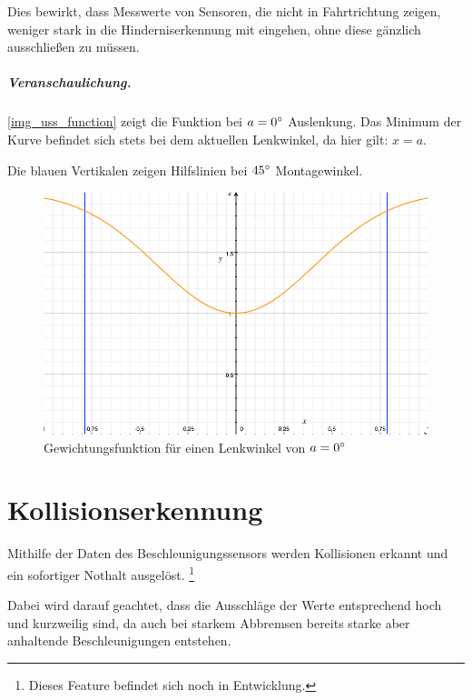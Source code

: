 \documentclass[a4paper,12pt]{report}
\begin{document}
	Dies bewirkt, dass Messwerte von Sensoren, die nicht in Fahrtrichtung zeigen, weniger stark in die Hinderniserkennung mit eingehen, ohne diese gänzlich ausschließen zu müssen.
	
	\paragraph{Veranschaulichung.} \autoref{img_uss_function} zeigt die Funktion bei $a = 0\degree$ Auslenkung.
	Das Minimum der Kurve befindet sich stets bei dem aktuellen Lenkwinkel, da hier gilt: $x = a$.
	
	Die blauen Vertikalen zeigen Hilfslinien bei $45\degree$ Montagewinkel.
	
	
	\begin{figure}
		\centering
		\includegraphics[width=\textwidth,height=\textheight,keepaspectratio]{assets/uss-function}
		\caption{Gewichtungsfunktion für einen Lenkwinkel von $a = 0\degree$}
		\label{img_uss_function}
	\end{figure}
	

\chapter{Kollisionserkennung}

	Mithilfe der Daten des Beschleunigungssensors werden Kollisionen erkannt und ein sofortiger Nothalt ausgelöst.
	\footnote{Dieses Feature befindet sich noch in Entwicklung.}
	
	Dabei wird darauf geachtet, dass die Ausschläge der Werte entsprechend hoch und kurzweilig sind, da auch bei starkem Abbremsen bereits starke aber anhaltende Beschleunigungen entstehen.
	
\end{document}
